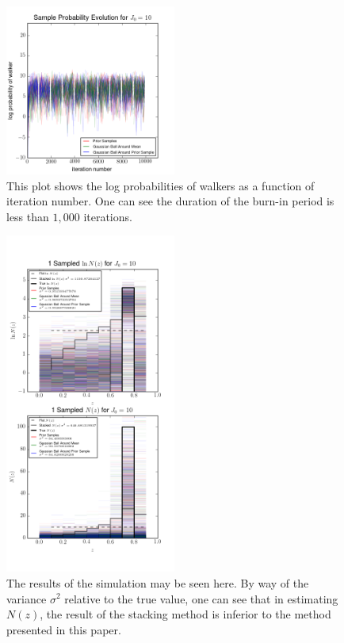 \documentclass[preprint]{aastex}
\begin{document}
\begin{figure}
\includegraphics[width=0.5\textwidth]{toy/probs.png}
\caption{This plot shows the log probabilities of walkers as a function of iteration number.  One can see the duration of the burn-in period is less than $1,000$ iterations.}
\label{fig:dumbestprob}
\end{figure}

\begin{figure}
\includegraphics[width=0.5\textwidth]{toy/samps.png}
\caption{The results of the simulation may be seen here.  By way of the variance $\sigma^{2}$ relative to the true value, one can see that in estimating $N(z)$, the result of the stacking method is inferior to the method presented in this paper.}
\label{fig:dumbestparam}
\end{figure}
\end{document}
